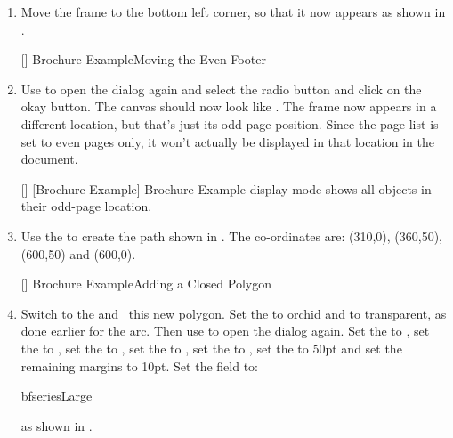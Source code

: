 \begin{enumerate}
[]
{}
{Brochure Example\dash Even Pages Display}

\item Move the  frame to the bottom left corner, so
that it now appears as shown in .

[]
{}
{Brochure Example\dash Moving the Even Footer}

\item Use  to open the
 dialog again and select the
 radio button and click on the okay
button. The \gls{canvas} should now look like
. The  frame now appears in
a different location, but that's just its odd page position. Since
the page list is set to even pages only, it won't actually be
displayed in that location in the document.

[]
{}
[Brochure Example\dash {}]
{Brochure Example\dash {} display mode shows all objects in
their odd-page location.}

\item Use the 
to create the \gls{path} shown in . The
co-ordinates are: (310,0), (360,50),
(600,50) and (600,0).

[]
{}
{Brochure Example\dash Adding a Closed Polygon}

\item Switch to the  and \select\ this new polygon. Set
the  to orchid and  to
\gls{transparent}, as done earlier for the arc. Then use
 to open the  dialog
again. Set the  to
, set the  to
, set the  to
, set the  to
, set the 
to , set the
 to 50\gls{pt} and set the remaining
margins to 10\gls{pt}. Set the  field
to:
\begin{compactcodebox}
\gls{bfseries}\gls{Large}
\end{compactcodebox}%
as shown in .


\end{enumerate}
